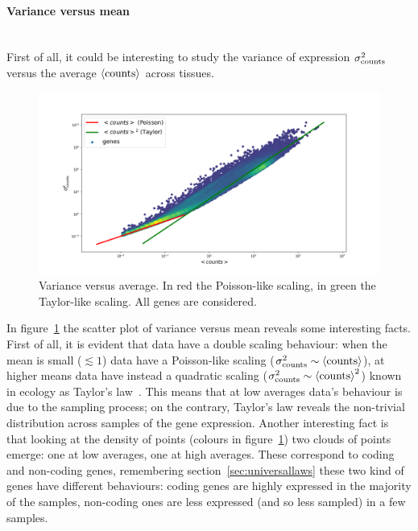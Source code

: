 \paragraph{Variance versus mean}\mbox{}\\
First of all, it could be interesting to study the variance of expression $\sigma^2_{\mathrm{counts}}$ versus 
the average $\left\langle \mathrm{counts}\right\rangle$ across tissues.
\begin{figure}[htb!]
    \centering
    \includegraphics[width=0.9\linewidth]{pictures/scalinglaws/gtex/allgenes/varmean_loglog.png}
    \caption{Variance versus average. In \textcolor{pythonred}{red} the Poisson-like scaling, in \textcolor{pythongreen}{green} the Taylor-like scaling. All genes are considered.}
    \label{fig:scalinglaws/gtex/allgenes/varmean_loglog_density}
\end{figure}
In figure~\ref{fig:scalinglaws/gtex/allgenes/varmean_loglog_density} the scatter plot of variance versus mean reveals some interesting facts.
First of all, it is evident that data have a double scaling behaviour: when the mean is small ($\lesssim 1$) data have a Poisson-like scaling ($\sigma^2_{\mathrm{counts}} \sim \left\langle \mathrm{counts}\right\rangle$), at higher means data have instead a quadratic scaling ($\sigma^2_{\mathrm{counts}} \sim \left\langle \mathrm{counts}\right\rangle^2$) known in ecology as Taylor's law~\cite{Eisler2008}. This means that at low averages data's behaviour is due to the sampling process; on the contrary, Taylor's law reveals the non-trivial distribution across samples of the gene expression.
Another interesting fact is that looking at the density of points (colours in figure~\ref{fig:scalinglaws/gtex/allgenes/varmean_loglog_density}) two clouds of points emerge: one at low averages, one at high averages. These correspond to coding and non-coding genes, remembering section~\ref{sec:universallaws} these two kind of genes have different behaviours: coding genes are highly expressed in the majority of the samples, non-coding ones are less expressed (and so less sampled) in a few samples. 


